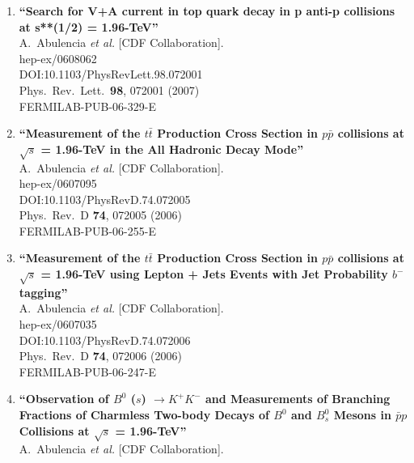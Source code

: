 \documentclass{article}
\begin{document}
\begin{enumerate}
\item%
{\bf ``Search for V+A current in top quark decay in p anti-p collisions at s**(1/2) = 1.96-TeV''}
  \\{}A.~Abulencia {\it et al.} [CDF Collaboration].
  \\{}hep-ex/0608062
  \\{}DOI:10.1103/PhysRevLett.98.072001
  \\{}Phys.\ Rev.\ Lett.\  {\bf 98}, 072001 (2007)
  \\{}FERMILAB-PUB-06-329-E
\item%
{\bf ``Measurement of the $t \bar{t}$ Production Cross Section in $p \bar{p}$ collisions at $\sqrt{s}$ = 1.96-TeV in the All Hadronic Decay Mode''}
  \\{}A.~Abulencia {\it et al.} [CDF Collaboration].
  \\{}hep-ex/0607095
  \\{}DOI:10.1103/PhysRevD.74.072005
  \\{}Phys.\ Rev.\ D {\bf 74}, 072005 (2006)
  \\{}FERMILAB-PUB-06-255-E
\item%
{\bf ``Measurement of the $t \bar{t}$ Production Cross Section in $p \bar{p}$ collisions at $\sqrt{s}$ = 1.96-TeV using Lepton + Jets Events with Jet Probability $b^-$ tagging''}
  \\{}A.~Abulencia {\it et al.} [CDF Collaboration].
  \\{}hep-ex/0607035
  \\{}DOI:10.1103/PhysRevD.74.072006
  \\{}Phys.\ Rev.\ D {\bf 74}, 072006 (2006)
  \\{}FERMILAB-PUB-06-247-E
\item%
{\bf ``Observation of $B^0$ ($s$) $\to K^{+} K^{-}$ and Measurements of Branching Fractions of Charmless Two-body Decays of $B^0$ and $B^0_{s}$ Mesons in $\bar{p} p$ Collisions at $\sqrt{s}$ = 1.96-TeV''}
  \\{}A.~Abulencia {\it et al.} [CDF Collaboration].

\end{enumerate}
\end{document}
